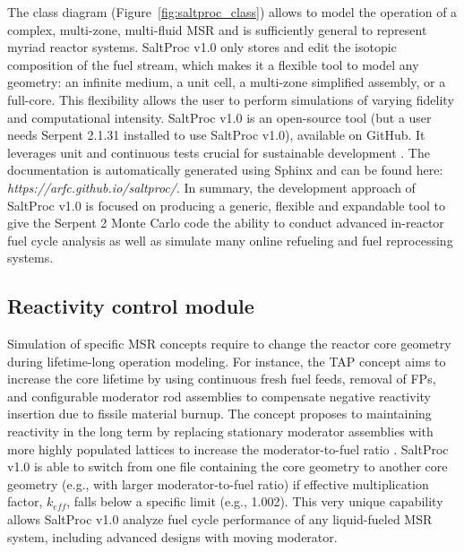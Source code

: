 The class diagram (Figure~\ref{fig:saltproc_class}) allows to model the 
operation of a complex, multi-zone, multi-fluid \gls{MSR} and is sufficiently 
general to represent myriad reactor systems. SaltProc v1.0 only stores and 
edit the isotopic composition of the fuel stream, which makes it a flexible 
tool to model any geometry: an infinite medium, a unit cell, a multi-zone 
simplified assembly, or a full-core. This flexibility allows the user to 
perform simulations of varying fidelity and computational intensity. 
SaltProc v1.0 is an open-source tool (but a user needs Serpent 2.1.31 
installed to use SaltProc v1.0), available on GitHub. It leverages unit and 
continuous tests crucial for sustainable development \cite{krekel_pytest_2004, 
travis_travis-ci/travis-api_2016}. The documentation is automatically 
generated using Sphinx \cite{brandl_sphinx_2009} and can be found here: 
\emph{https://arfc.github.io/saltproc/}. In summary, the development approach 
of SaltProc v1.0 is focused on producing a generic, flexible and expandable 
tool to give the Serpent 2 Monte Carlo code the ability to conduct advanced 
in-reactor fuel cycle analysis as well as simulate many online refueling and 
fuel reprocessing systems.

\subsection{Reactivity control module}
Simulation of specific \gls{MSR} concepts require to change the reactor core 
geometry during lifetime-long operation modeling. For instance, the \gls{TAP} 
concept aims to increase the core lifetime by using continuous fresh fuel 
feeds, removal of \glspl{FP}, and configurable moderator rod assemblies to 
compensate negative reactivity insertion due to fissile material burnup. The 
concept proposes to maintaining reactivity in the long term by replacing 
stationary moderator assemblies with more highly populated lattices to 
increase the moderator-to-fuel ratio \cite{betzler_assessment_2017-1}. 
SaltProc v1.0 is able to switch from one file containing the core geometry to 
another core geometry (e.g., with larger moderator-to-fuel ratio) if effective 
multiplication factor, $k_{eff}$, falls below a specific limit (e.g., 1.002). 
This very unique capability allows SaltProc v1.0 analyze fuel cycle 
performance of any liquid-fueled \gls{MSR} system, including advanced designs 
with moving moderator.

